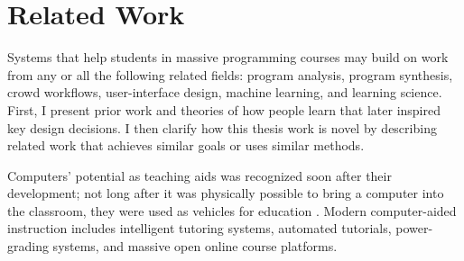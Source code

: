 \chapter{Related Work}\label{chapter:relatedwork}

Systems that help students in massive programming courses may build on work from any or all the following related fields: program analysis, program synthesis, crowd workflows, user-interface design, machine learning, and learning science. First, I present prior work and theories of how people learn that later inspired key design decisions. I then clarify how this thesis work is novel by describing related work that achieves similar goals or uses similar methods.

Computers' potential as teaching aids was recognized soon after their development; not long after it was physically possible to bring a computer into the classroom, they were used as vehicles for education \cite{computersInEdu}. Modern computer-aided instruction includes intelligent tutoring systems, automated tutorials, power-grading systems, and massive open online course platforms. 






